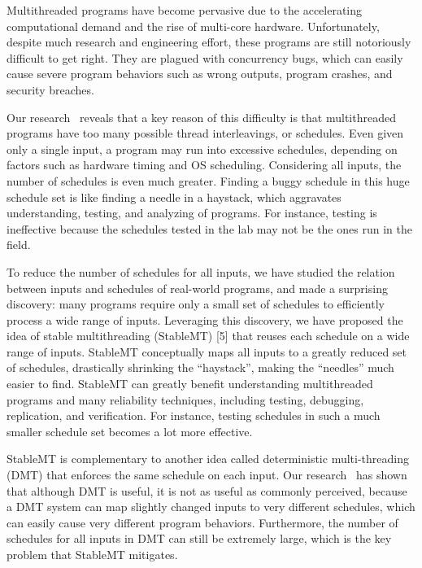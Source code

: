 \documentclass[10pt,onecolumn,letterpaper]{article}
\begin{document}
\begin{sloppypar}

Multithreaded programs have become pervasive due to the accelerating  
computational demand and the rise of multi-core hardware. Unfortunately, despite 
much research and engineering effort, these programs are still notoriously 
difficult to get right. They are plagued with concurrency bugs, which can easily 
cause severe program behaviors such as wrong outputs, program crashes, and 
security breaches.

Our research~\cite{smt:cacm} reveals that a key reason of this difficulty is 
that  multithreaded programs have too many possible thread interleavings, or 
schedules. Even given only a single input, a program may run into excessive 
schedules, depending on factors such as hardware timing and OS scheduling. 
Considering all inputs, the number of schedules is even much greater. Finding a 
buggy schedule in this huge schedule set is like finding a needle in a haystack, 
which aggravates understanding, testing, and analyzing of programs. For 
instance, testing is ineffective because the schedules tested in the lab may not 
be the ones run in the field.

To reduce the number of schedules for all inputs, we have studied the relation  
between inputs and schedules of real-world programs, and made a surprising 
discovery: many programs require only a small set of schedules to efficiently 
process a wide range of inputs. Leveraging this discovery, we have proposed the 
idea of stable multithreading (StableMT) [5] that reuses each schedule on a wide 
range of inputs. StableMT conceptually maps all inputs to a greatly reduced set 
of schedules, drastically shrinking the “haystack”, making the “needles” much 
easier to find. StableMT can greatly benefit understanding multithreaded 
programs and many reliability techniques, including testing, debugging, 
replication, and verification. For instance, testing schedules in such a much 
smaller schedule set becomes a lot more effective.

StableMT is complementary to another idea called deterministic multi-threading  
(DMT) that enforces the same schedule on each input. Our 
research~\cite{smt:cacm} has shown that although DMT is useful, it is not as 
useful as commonly perceived, because a DMT system can map slightly changed 
inputs to very different schedules, which can easily cause very different 
program behaviors. Furthermore, the number of schedules for all inputs in DMT 
can still be extremely large, which is the key problem that StableMT mitigates. 



\end{sloppypar}
\end{document}
